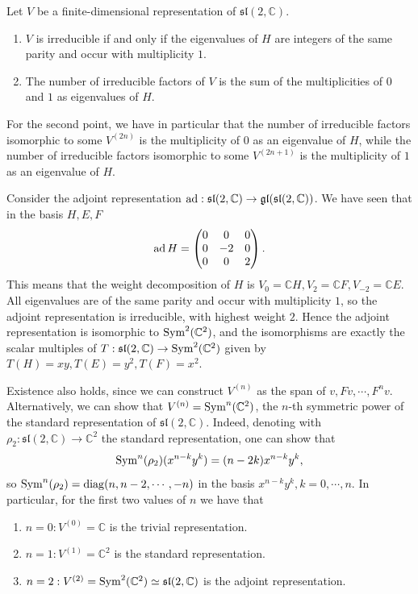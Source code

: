 \documentclass{report}
\begin{document}
\begin{remark}
    Let $V$ be a finite-dimensional representation of $\mathfrak{sl}(2, \mathbb C)$.
    \begin{enumerate}[label = (\roman*)]
        \item $V$ is irreducible if and only if the eigenvalues of $H$ are integers of the same parity and occur with multiplicity $1$.
        \item The number of irreducible factors of $V$ is the sum of the multiplicities of $0$ and $1$ as eigenvalues of $H$.
    \end{enumerate}
    For the second point, we have in particular that the number of irreducible factors isomorphic to some $V^{(2n)}$ is the multiplicity of $0$ as an eigenvalue of $H$, while the number of irreducible factors isomorphic to some $V^{(2n+1)}$ is the multiplicity of $1$ as an eigenvalue of $H$.
\end{remark}
\begin{example}
    Consider the adjoint representation $\operatorname{ad}: \mathfrak{sl}(2, \mathbb C) \to \mathfrak{gl}(\mathfrak{sl}(2, \mathbb C))$.
    We have seen that in the basis $H, E, F$
    \[
    \operatorname{ad} H = \begin{pmatrix} 0 & 0 & 0 \\ 0 & -2 & 0 \\ 0 & 0 & 2 \end{pmatrix}.
    \]
    This means that the weight decomposition of $H$ is $V_0 = \mathbb C H, V_2 = \mathbb C F, V_{-2} = \mathbb C E$.
    All eigenvalues are of the same parity and occur with multiplicity $1$, so the adjoint representation is irreducible, with highest weight $2$.
    Hence the adjoint representation is isomorphic to $\operatorname{Sym}^2(\mathbb C^2)$, and the isomorphisms are exactly the scalar multiples of $T: \mathfrak{sl}(2, \mathbb C) \to \operatorname{Sym}^2(\mathbb C^2)$ given by $T(H) = xy, T(E) = y^2, T(F) = x^2$.
\end{example}
Existence also holds, since we can construct $V^{(n)}$ as the span of $v, Fv, \cdots, F^nv$.
Alternatively, we can show that $V^{(n)} = \operatorname{Sym}^n(\mathbb C^2)$, the $n$-th symmetric power of the standard representation of $\mathfrak{sl}(2, \mathbb C)$.
Indeed, denoting with $\rho_2: \mathfrak{sl}(2, \mathbb C) \to \mathbb C^2 $ the standard representation, one can show that
\[
\operatorname{Sym}^n(\rho_2)(x^{n-k}y^k) = (n - 2k) x^{n-k}y^k,
\]
so $\operatorname{Sym}^n(\rho_2) = \operatorname{diag}(n, n-2, \cdots, -n)$ in the basis $x^{n-k}y^k, k = 0, \cdots, n$.
In particular, for the first two values of $n$ we have that
\begin{enumerate}[label = (\roman*)]
    \item $n = 0: V^{(0)} = \mathbb C$ is the trivial representation.
    \item $n = 1: V^{(1)} = \mathbb C^2$ is the standard representation.
    \item $n = 2: V^{(2)} = \operatorname{Sym}^2(\mathbb C^2) \simeq \operatorname{{\mathfrak{sl}}}(2, \mathbb C)$ is the adjoint representation. 
\end{enumerate}
\end{document}
